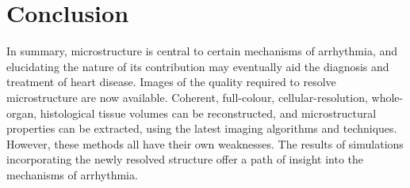 \section{Conclusion} %
\label{sec:conclusion}
  In summary, microstructure is central to certain mechanisms of arrhythmia, and elucidating the nature of its contribution may eventually aid the diagnosis and treatment of heart disease. Images of the quality required to resolve microstructure are now available. Coherent, full-colour, cellular-resolution, whole-organ, histological tissue volumes can be reconstructed, and microstructural properties can be extracted, using the latest imaging algorithms and techniques. However, these methods all have their own weaknesses. The results of simulations incorporating the newly resolved structure offer a path of insight into the mechanisms of arrhythmia.
